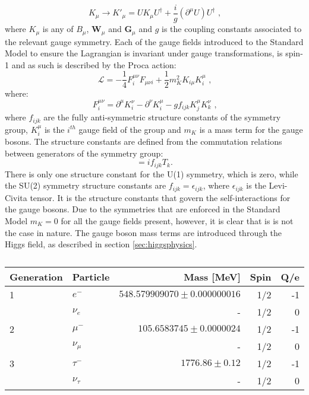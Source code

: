 %
\begin{equation}
K_{\mu} \rightarrow K'_{\mu} = UK_{\mu}U^{\dagger} + \frac{i}{g}(\partial^{\mu}U)U^{\dagger} \text{ ,} 
\end{equation}
%
\noindent where $K_{\mu}$ is any of $B_{\mu}$, $\textbf{W}_{\mu}$ and $\textbf{G}_{\mu}$ and $g$ is the coupling constants associated to the relevant gauge symmetry.  Each of the gauge fields introduced to the Standard Model to ensure the Lagrangian is invariant under gauge transformations, is spin-1 and as such is described by the Proca action:
%
\begin{equation}
\mathcal{L} = -\frac{1}{4}F^{{\mu}{\nu}}_{i}F_{{\mu}{\nu}{i}} + \frac{1}{2}m_{K}^{2}K_{i\mu}K^{\mu}_{i} \text{ ,} 
\end{equation}
%
\noindent where:
%
\begin{equation}
F^{{\mu}{\nu}}_{i} = \partial^{\mu}K^{\nu}_{i} - \partial^{\nu}K^{\mu}_{i} - gf_{ijk}K^{\mu}_{j}K^{\nu}_{k} \text{ ,} 
\end{equation}
%
\noindent where $f_{ijk}$ are the fully anti-symmetric structure constants of the symmetry group, $K^{\mu}_{i}$ is the $i^{th}$ gauge field of the group and $m_{K}$ is a mass term for the gauge bosons.  The structure constants are defined from the commutation relations between generators of the symmetry group:
%
\begin{equation}
[T_{i},T_{j}] = if_{ijk}T_{k} \text{.} 
\end{equation}
%
\noindent There is only one structure constant for the U(1) symmetry, which is zero, while the SU(2) symmetry structure constants are $f_{ijk} = \epsilon_{ijk}$, where $\epsilon_{ijk}$ is the Levi-Civita tensor.  It is the structure constants that govern the self-interactions for the gauge bosons.  Due to the symmetries that are enforced in the Standard Model $m_{K} = 0$ for all the gauge fields present, however, it is clear that is is not the case in nature.  The gauge boson mass terms are introduced through the Higgs field, as described in section \ref{sec:higgsphysics}. 

\begin{table}[h!]
\centering
\begin{tabular}{l l r r r}
\hline
Generation & Particle & Mass [MeV] & Spin & Q/e \\
\hline
1 & $e^{-}$ & $548.579909070\pm0.000000016$ & 1/2 & -1 \\
& $\nu_{e}$ & - & 1/2 & 0 \\
\hline
2 & $\mu^{-}$ & $105.6583745\pm0.0000024$ & 1/2 & -1 \\
& $\nu_{\mu}$ & - & 1/2 & 0 \\
\hline
3 & $\tau^{-}$ & $1776.86\pm0.12$ & 1/2 & -1 \\
& $\nu_{\tau}$ & - & 1/2 & 0 \\
\end{tabular}
\caption[]{}
\label{table:smleptons}
\end{table}

